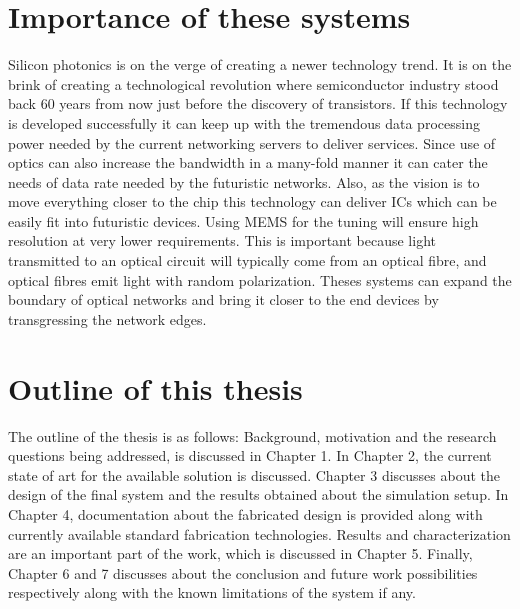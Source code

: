 \documentclass[../report.tex]{subfiles}
\begin{document}
	\section{Importance of these systems}
Silicon photonics is on the verge of creating a newer technology trend. It is on the brink of creating a technological revolution where semiconductor industry stood back 60 years from now just before the discovery of transistors. If this technology is developed successfully it can keep up with the tremendous data processing power needed by the current networking servers to deliver services. Since use of optics can also increase the bandwidth in a many-fold manner it can cater the needs of data rate needed by the futuristic networks. Also, as the vision is to move everything closer to the chip this technology can deliver ICs which can be easily fit into futuristic devices. Using MEMS for the tuning will ensure high resolution at very lower requirements. This is important because light transmitted to an optical circuit will typically come from an optical fibre, and optical fibres emit light with random polarization. Theses systems can expand the boundary of optical networks and bring it closer to the end devices by transgressing the network edges.
	
	\section{Outline of this thesis}
The outline of the thesis is as follows: Background, motivation and the research
questions being addressed, is discussed in Chapter 1. In Chapter 2, the current state of art for the available solution is discussed. Chapter 3 discusses about the design of the final system and the results obtained about the simulation setup. In Chapter 4, documentation about the fabricated design is provided along with currently available standard fabrication technologies. Results and characterization are an important part of the work, which is discussed in Chapter 5. Finally, Chapter 6 and 7 discusses about the conclusion and future work possibilities respectively along with the known limitations of the system if any.  
	
\end{document}
